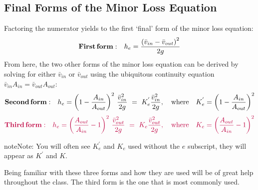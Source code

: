 \documentclass[letterpaper,10pt,english]{sphinxmanual}
\begin{document}
\subsection{Final Forms of the Minor Loss Equation}
\label{\detokenize{Fluids_Review/Fluids_Review_Derivations:final-forms-of-the-minor-loss-equation}}\label{\detokenize{Fluids_Review/Fluids_Review_Derivations:final-minor-loss-equations}}
Factoring the numerator yields to the first ‘final’ form of the minor loss equation:
\begin{equation}\label{equation:Fluids_Review/Fluids_Review_Derivations:Fluids_Review/Fluids_Review_Derivations:12}
\begin{split}{\rm{ \mathbf{First \, form:} }} \quad h_e = \frac{\left( \bar v_{in}  - \bar v_{out} \right)^2}{2g}\end{split}
\end{equation}
From here, the two other forms of the minor loss equation can be derived by solving for either \(\bar v_{in}\) or \(\bar v_{out}\) using the ubiquitous continuity equation \(\bar v_{in} A_{in} = \bar v_{out} A_{out}\):
\begin{equation}\label{equation:Fluids_Review/Fluids_Review_Derivations:Fluids_Review/Fluids_Review_Derivations:13}
\begin{split}{\rm{ \mathbf{Second \, form:} }} \quad h_e = \left( 1 - \frac{A_{in}}{A_{out}} \right)^2 \, \frac{\bar v_{in}^2}{2g} \, \, = \, \, K_e^{'} \frac{\bar v_{in}^2}{2g}, \quad {\rm where} \quad K_e^{'} = \left( 1 - \frac{A_{in}}{A_{out}} \right)^2\end{split}
\end{equation}\begin{equation}\label{equation:Fluids_Review/Fluids_Review_Derivations:minor_loss_equation}
\begin{split}   \color{purple}{
   {\rm{ \mathbf{Third \, form:} }} \quad h_e = \left( \frac{A_{out}}{A_{in}} -1 \right)^2 \, \frac{\bar  v_{out}^2}{2g} \, \, = \, \, K_e \frac{\bar v_{out}^2}{2g}, \quad {\rm where} \quad K_e = \left( \frac{A_{out}}{A_{in}} - 1 \right)^2
   }\end{split}
\end{equation}
\begin{sphinxadmonition}{note}{Note:}
You will often see \(K_e^{'}\) and \(K_e\) used without the \(e\) subscript, they will appear as \(K^{'}\) and \(K\).
\end{sphinxadmonition}

Being familiar with these three forms and how they are used will be of great help throughout the class. The third form is the one that is most commonly used.
\end{document}
